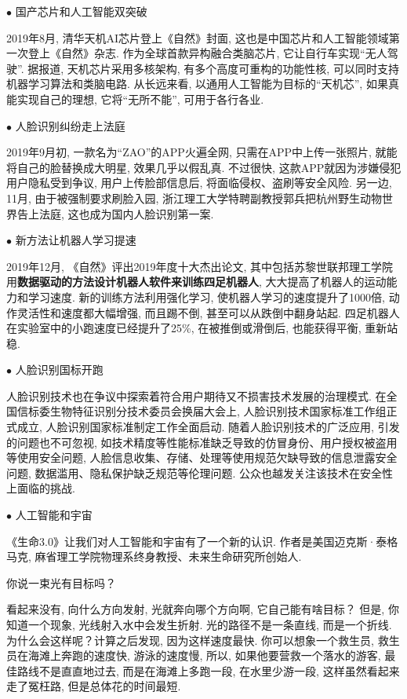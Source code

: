 $\bullet$ 国产芯片和人工智能双突破

2019年8月, 清华天机AI芯片登上《自然》封面, 这也是中国芯片和人工智能领域第一次登上《自然》杂志. 作为全球首款异构融合类脑芯片, 它让自行车实现“无人驾驶”. 据报道, 天机芯片采用多核架构, 有多个高度可重构的功能性核, 可以同时支持机器学习算法和类脑电路. 从长远来看, 以通用人工智能为目标的“天机芯”, 如果真能实现自己的理想, 它将“无所不能”, 可用于各行各业.

$\bullet$ 人脸识别纠纷走上法庭

2019年9月初, 一款名为“ZAO”的APP火遍全网, 只需在APP中上传一张照片, 就能将自己的脸替换成大明星, 效果几乎以假乱真. 不过很快, 这款APP就因为涉嫌侵犯用户隐私受到争议, 用户上传脸部信息后, 将面临侵权、盗刷等安全风险. 另一边, 11月, 由于被强制要求刷脸入园, 浙江理工大学特聘副教授郭兵把杭州野生动物世界告上法庭, 这也成为国内人脸识别第一案.

$\bullet$ 新方法让机器人学习提速

2019年12月, 《自然》评出2019年度十大杰出论文, 其中包括苏黎世联邦理工学院用\textbf{数据驱动的方法设计机器人软件来训练四足机器人}, 大大提高了机器人的运动能力和学习速度. 新的训练方法利用强化学习, 使机器人学习的速度提升了1000倍, 动作灵活性和速度都大幅增强, 而且踢不倒, 甚至可以从跌倒中翻身站起. 四足机器人在实验室中的小跑速度已经提升了25\%, 在被推倒或滑倒后, 也能获得平衡, 重新站稳.

$\bullet$ 人脸识别国标开跑

人脸识别技术也在争议中探索着符合用户期待又不损害技术发展的治理模式. 在全国信标委生物特征识别分技术委员会换届大会上, 人脸识别技术国家标准工作组正式成立, 人脸识别国家标准制定工作全面启动.
随着人脸识别技术的广泛应用, 引发的问题也不可忽视, 如技术精度等性能标准缺乏导致的仿冒身份、用户授权被盗用等使用安全问题, 人脸信息收集、存储、处理等使用规范欠缺导致的信息泄露安全问题, 数据滥用、隐私保护缺乏规范等伦理问题. 公众也越发关注该技术在安全性上面临的挑战.

$\bullet$ 人工智能和宇宙

《生命3.0》让我们对人工智能和宇宙有了一个新的认识. 作者是美国迈克斯·泰格马克, 麻省理工学院物理系终身教授、未来生命研究所创始人.
\begin{example}
你说一束光有目标吗？
\end{example}
看起来没有, 向什么方向发射, 光就奔向哪个方向啊, 它自己能有啥目标？
但是, 你知道一个现象, 光线射入水中会发生折射. 光的路径不是一条直线, 而是一个折线.
为什么会这样呢？计算之后发现, 因为这样速度最快.
你可以想象一个救生员, 救生员在海滩上奔跑的速度快, 游泳的速度慢, 所以, 如果他要营救一个落水的游客, 最佳路线不是直直地过去, 而是在海滩上多跑一段, 在水里少游一段, 这样虽然看起来走了冤枉路, 但是总体花的时间最短.

